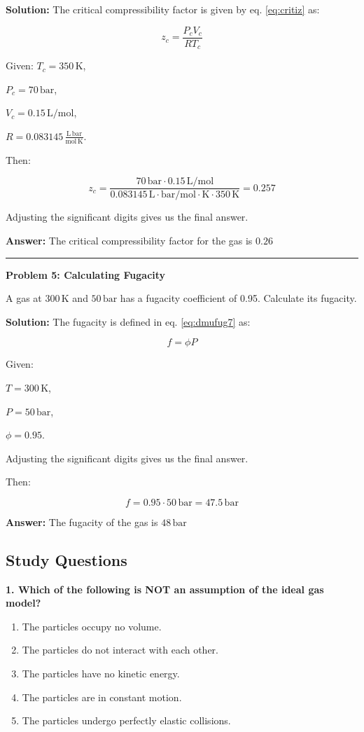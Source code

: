 \documentclass[
  9pt,
]{extbook}
\providecommand{\tightlist}{%
  \setlength{\itemsep}{0pt}\setlength{\parskip}{0pt}}
\theoremstyle{definition}
\theoremstyle{definition}
\theoremstyle{definition}
\theoremstyle{remark}
\begin{document}
\textbf{Solution:} The critical compressibility factor is given by eq. \eqref{eq:critiz} as:

\[z_c = \frac{P_cV_c}{RT_c}\]

Given:
\(T_c = 350\,\text{K}\),

\(P_c = 70\,\text{bar}\),

\(V_c = 0.15\,\text{L}/\text{mol}\),

\(R = 0.083145\,\frac{\text{L}\,\text{bar}}{\text{mol}\,\text{K}}\).

Then:

\[z_c = \frac{70\,\text{bar} \cdot 0.15\,\text{L}/\text{mol}}{0.083145\,\text{L}\cdot\text{bar}/\text{mol}\cdot\text{K} \cdot 350\,\text{K}}=0.257\]

Adjusting the significant digits gives us the final answer.

\textbf{Answer:} The critical compressibility factor for the gas is \(0.26\)

\begin{center}\rule{0.5\linewidth}{0.5pt}\end{center}

\textbf{Problem 5: Calculating Fugacity}

A gas at \(300\,\text{K}\) and \(50\,\text{bar}\) has a fugacity coefficient of 0.95. Calculate its fugacity.

\textbf{Solution:} The fugacity is defined in eq. \eqref{eq:dmufug7} as:

\[f = \phi P\]

Given:

\(T = 300\,\text{K}\),

\(P = 50\,\text{bar}\),

\(\phi = 0.95\).

Adjusting the significant digits gives us the final answer.

Then:

\[f = 0.95 \cdot 50\,\text{bar}=47.5\,\text{bar} \]

\textbf{Answer:} The fugacity of the gas is \(48\,\text{bar}\)

\hypertarget{quest11}{%
\subsection{Study Questions}\label{quest11}}

\textbf{1. Which of the following is NOT an assumption of the ideal gas model?}

\begin{enumerate}
\def\labelenumi{\alph{enumi}.}
\tightlist
\item
  The particles occupy no volume.
\item
  The particles do not interact with each other.
\item
  The particles have no kinetic energy.
\item
  The particles are in constant motion.
\item
  The particles undergo perfectly elastic collisions.
\end{enumerate}
\end{document}
